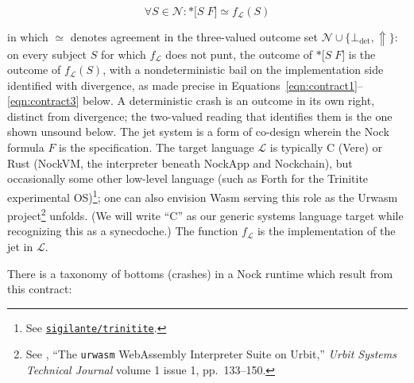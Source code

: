 \documentclass[twoside]{article}
\begin{document}
\begin{equation}\label{eqn:jet}
\forall S \in \mathcal{N}: \texttt{*[}S\; F\texttt{]} \simeq f_{\mathcal{L}}(S)
\end{equation}

\noindent
in which $\simeq$ denotes agreement in the three-valued outcome set $\mathcal{N} \cup \{\bot_\text{det}, \Uparrow\}$:  on every subject $S$ for which $f_{\mathcal{L}}$ does not punt, the outcome of $\texttt{*[}S\; F\texttt{]}$ is the outcome of $f_{\mathcal{L}}(S)$, with a nondeterministic bail on the implementation side identified with divergence, as made precise in Equations~\ref{eqn:contract1}--\ref{eqn:contract3} below.  A deterministic crash is an outcome in its own right, distinct from divergence; the two-valued reading that identifies them is the one shown unsound below.  The jet system is a form of co-design wherein the Nock formula $F$ is the specification.  The target language $\mathcal{L}$ is typically C (Vere) or Rust (NockVM, the interpreter beneath NockApp and Nockchain), but occasionally some other low-level language (such as Forth for the Trinitite experimental OS)\footnote{See \href{https://github.com/sigilante/trinitite}{\texttt{sigilante/trinitite}}.}; one can also envision Wasm serving this role as the Urwasm project\footnote{See , ``The \texttt{urwasm} WebAssembly Interpreter Suite on Urbit,'' \emph{Urbit Systems Technical Journal} volume 1 issue 1, pp.~133--150.} unfolds.  (We will write ``C'' as our generic systems language target while recognizing this as a synecdoche.)  The function $f_{\mathcal{L}}$ is the implementation of the jet in $\mathcal{L}$.

There is a taxonomy of bottoms (crashes) in a Nock runtime which result from this contract:
\end{document}

